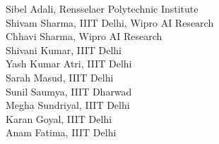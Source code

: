 \documentclass[11pt,oneside]{book}
\begin{document}
\begin{description}
          Sibel Adali, Rensselaer Polytechnic Institute\\
          Shivam Sharma, IIIT Delhi, Wipro AI Research\\
          Chhavi Sharma, Wipro AI Research\\
          Shivani Kumar, IIIT Delhi\\
          Yash Kumar Atri, IIIT Delhi\\
          Sarah Masud, IIIT Delhi\\
          Sunil Saumya, IIIT Dharwad\\
          Megha Sundriyal, IIIT Delhi\\
          Karan Goyal, IIIT Delhi\\
          Anam Fatima, IIIT Delhi\\
      
\end{description}
\newpage

\end{document}
